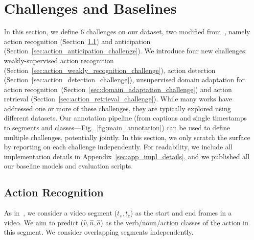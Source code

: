 \documentclass[twocolumn]{svjour3}          \smartqed
\newcommand{\chParagraph}[1]{\noindent {\textbf{#1.}} \hspace{6pt}}
\begin{document}
\section{Challenges and Baselines}
\label{sec:challenges}
In this section, we define 6 challenges on our dataset, two modified from~\cite{Damen2018EPICKITCHENS}, namely action recognition (Section~\ref{sec:action_recognition_challenge}) and anticipation (Section~\ref{sec:action_anticipation_challenge}). We introduce four new challenges: weakly-supervised action recognition (Section~\ref{sec:action_weakly_recognition_challenge}), action detection (Section~\ref{sec:action_detection_challenge}),  unsupervised domain adaptation for action recognition~(Section~\ref{sec:domain_adaptation_challenge}) and action retrieval (Section~\ref{sec:action_retrieval_challenge}). 
While many works have addressed one or more of these challenges, they are typically explored using different datasets. Our annotation pipeline (from captions and single timestamps to segments and classes---Fig.~\ref{fig:main_annotation}) can be used to define multiple challenges, potentially jointly. In this section, we only scratch the surface by reporting on each challenge independently. For readability, we include all implementation details in Appendix~\ref{sec:app_impl_details}, and we published all our baseline models and evaluation scripts.
\subsection{Action Recognition}
\label{sec:action_recognition_challenge}
\chParagraph{Definition} As in~\cite{Damen2018EPICKITCHENS}, we consider a video segment ($t_s, t_e$) as the start and end frames in a video. We aim to predict ($\hat{v}, \hat{n}, \hat{a}$) as the verb/noun/action classes of the action in this segment. We consider overlapping segments independently.
\end{document}

